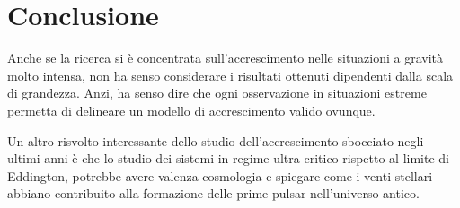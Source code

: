 \documentclass[a4paperbi]{article}
\begin{document}
\newpage
\section{Conclusione}

	Anche se la ricerca si è concentrata sull'accrescimento nelle situazioni a gravità molto intensa, non ha senso considerare i risultati ottenuti dipendenti dalla scala di grandezza. Anzi, ha senso dire che ogni osservazione in situazioni estreme permetta di delineare un modello di accrescimento valido ovunque.
	
	Un altro risvolto interessante dello studio dell'accrescimento sbocciato negli ultimi anni è che lo studio dei sistemi in regime ultra-critico rispetto al limite di Eddington, potrebbe avere valenza cosmologia e spiegare come i venti stellari abbiano contribuito alla formazione delle prime pulsar nell'universo antico.
	
\end{document}

